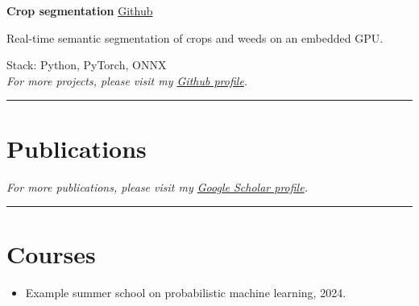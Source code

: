 \noindent \textbf{Crop segmentation} \href{https://github.com/example/crop-seg}{Github}

\noindent Real-time semantic segmentation of crops and weeds on an embedded GPU.

\noindent Stack: Python, PyTorch, ONNX\\

\textit{For more projects, please visit my \href{https://github.com/example}{Github profile}.}
\vspace{0.5\baselineskip}\hrule\vspace{0.5\baselineskip}

\section*{Publications}
\vspace{-1.5\baselineskip}
\renewcommand{\refname}{}
\nocite{*}



\textit{For more publications, please visit my \href{https://scholar.google.com}{Google Scholar profile}.}
\vspace{0.5\baselineskip}\hrule\vspace{0.5\baselineskip}

\section*{Courses}
\begin{itemize}[leftmargin=*]
    \item Example summer school on probabilistic machine learning, 2024.
\end{itemize}


